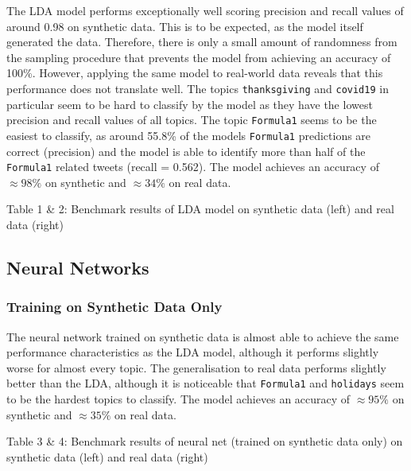 \documentclass[11pt]{article}
\begin{document}
The LDA model performs exceptionally well scoring precision and recall values of around 0.98 on synthetic data. This is to be expected, as the model itself generated the data. Therefore, there is only a small amount of randomness from the sampling procedure that prevents the model from achieving an accuracy of 100\%. However, applying the same model to real-world data reveals that this performance does not translate well. The topics \texttt{thanksgiving} and \texttt{covid19} in particular seem to be hard to classify by the model as they have the lowest precision and recall values of all topics. The topic \texttt{Formula1} seems to be the easiest to classify, as around 55.8\% of the models \texttt{Formula1} predictions are correct (precision) and the model is able to identify more than half of the \texttt{Formula1} related tweets (recall = 0.562). The model achieves an accuracy of $\approx 98\%$ on synthetic and $\approx 34\%$ on real data.
\begin{center}

\qquad

\end{center}
\begin{center}
Table 1 \& 2: Benchmark results of LDA model on synthetic data (left) and real data (right)
\end{center}

\subsection{Neural Networks}
\subsubsection{Training on Synthetic Data Only}
The neural network trained on synthetic data is almost able to achieve the same performance characteristics as the LDA model, although it performs slightly worse for almost every topic. The generalisation to real data performs slightly better than the LDA, although it is noticeable that \texttt{Formula1} and \texttt{holidays} seem to be the hardest topics to classify.
The model achieves an accuracy of $\approx 95\%$ on synthetic and $\approx 35\%$ on real data.

\begin{center}
	
\qquad

\end{center}
\begin{center}
Table 3 \& 4: Benchmark results of neural net (trained on synthetic data only) on synthetic data (left) and real data (right)
\end{center}
\end{document}

